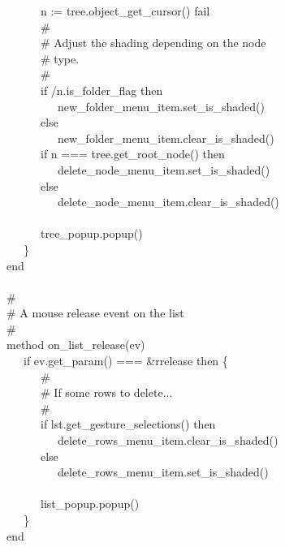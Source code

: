 {\>   \ \ \ \ \ \ n := tree.object\_get\_cursor() {\textbar} fail \\
\>   \ \ \ \ \ \ \# \\
\>   \ \ \ \ \ \ \# Adjust the shading depending on the node  \\
\>   \ \ \ \ \ \ \# type. \\
\>   \ \ \ \ \ \ \# \\
\>   \ \ \ \ \ \ if /n.is\_folder\_flag then \\
\>   \ \ \ \ \ \ \ \ \ new\_folder\_menu\_item.set\_is\_shaded() \\
\>   \ \ \ \ \ \ else \\
\>   \ \ \ \ \ \ \ \ \ new\_folder\_menu\_item.clear\_is\_shaded() \\
\>   \ \ \ \ \ \ if n === tree.get\_root\_node() then \\
\>   \ \ \ \ \ \ \ \ \ delete\_node\_menu\_item.set\_is\_shaded() \\
\>   \ \ \ \ \ \ else \\
\>   \ \ \ \ \ \ \ \ \ delete\_node\_menu\_item.clear\_is\_shaded() \\
\ \\
\>   \ \ \ \ \ \ tree\_popup.popup() \\
\>   \ \ \ \} \\
\>   end \\
\ \\
\>   \# \\
\>   \# A mouse release event on the list \\
\>   \# \\
\>   method on\_list\_release(ev) \\
\>   \ \ \ if ev.get\_param() === \&rrelease then \{ \\
\>   \ \ \ \ \ \ \# \\
\>   \ \ \ \ \ \ \# If some rows to delete... \\
\>   \ \ \ \ \ \ \# \\
\>   \ \ \ \ \ \ if lst.get\_gesture\_selections() then \\
\>   \ \ \ \ \ \ \ \ \ delete\_rows\_menu\_item.clear\_is\_shaded() \\
\>   \ \ \ \ \ \ else \\
\>   \ \ \ \ \ \ \ \ \ delete\_rows\_menu\_item.set\_is\_shaded() \\
\ \\
\>   \ \ \ \ \ \ list\_popup.popup() \\
\>   \ \ \ \} \\
\>   end \\
}
